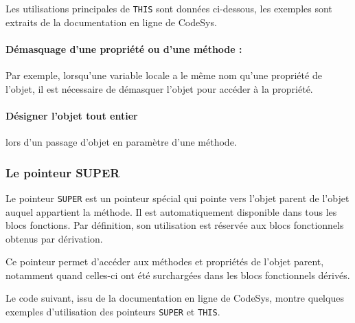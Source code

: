 Les utilisations principales de \lstinline{THIS} sont données ci-dessous, les exemples sont extraits de la documentation en ligne de CodeSys. 

\paragraph{Démasquage d'une propriété ou d'une méthode : } Par exemple, lorsqu'une variable locale a le même nom qu'une propriété de l'objet, il est nécessaire de démasquer l'objet pour accéder à la propriété.  



\paragraph{Désigner l'objet tout entier} lors d'un passage d'objet en paramètre d'une méthode.



\subsubsection{Le pointeur SUPER}
Le pointeur \lstinline{SUPER} est un pointeur spécial qui pointe vers l'objet parent de l'objet auquel appartient la méthode. Il est automatiquement disponible dans tous les blocs fonctions. Par définition, son utilisation est réservée aux blocs fonctionnels obtenus par dérivation. 

Ce pointeur permet d'accéder aux méthodes et propriétés de l'objet parent, notamment quand celles-ci ont été surchargées dans les blocs fonctionnels dérivés. 

Le code suivant, issu de la documentation en ligne de CodeSys, montre quelques exemples d'utilisation des pointeurs \lstinline{SUPER} et \lstinline{THIS}.



